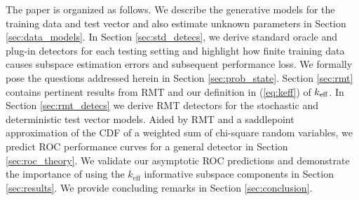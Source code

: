 The paper is organized as follows. We describe the generative models for the training data and test vector and also estimate unknown parameters in Section \ref{sec:data_models}. In Section \ref{sec:std_detecs}, we derive standard oracle and plug-in detectors for each testing setting and highlight how finite training data causes subspace estimation errors and subsequent performance loss. We formally pose the questions addressed herein in Section \ref{sec:prob_state}. Section \ref{sec:rmt} contains pertinent results from RMT and our definition in (\ref{eq:keff}) of $k_\text{eff}$. In Section \ref{sec:rmt_detecs} we derive RMT detectors for the stochastic and deterministic test vector models. Aided by RMT and a saddlepoint approximation of the CDF of a weighted sum of chi-square random variables, we predict ROC performance curves for a general detector in Section \ref{sec:roc_theory}. We validate our asymptotic ROC predictions and demonstrate the importance of using the $k_\text{eff}$ informative subspace components in Section \ref{sec:results}. We provide concluding remarks in Section \ref{sec:conclusion}.





